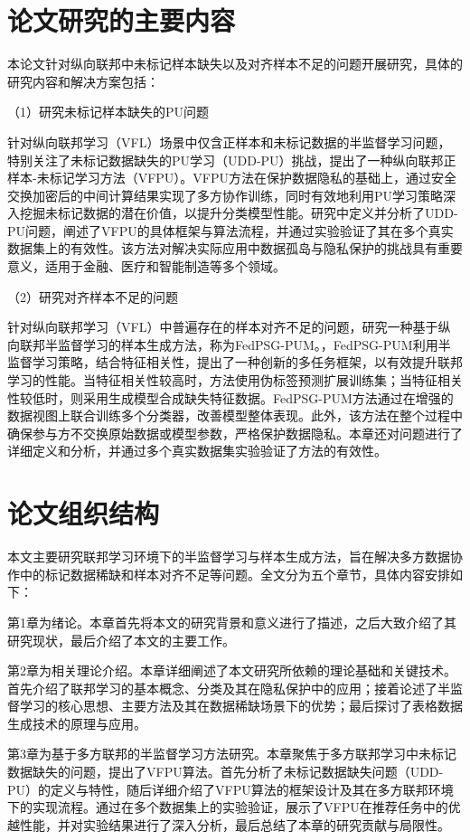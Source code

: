 \section{论文研究的主要内容}
本论文针对纵向联邦中未标记样本缺失以及对齐样本不足的问题开展研究，具体的研究内容和解决方案包括：

（1）研究未标记样本缺失的PU问题

针对纵向联邦学习（VFL）场景中仅含正样本和未标记数据的半监督学习问题，特别关注了未标记数据缺失的PU学习（UDD-PU）挑战，提出了一种纵向联邦正样本-未标记学习方法（VFPU）。VFPU方法在保护数据隐私的基础上，通过安全交换加密后的中间计算结果实现了多方协作训练，同时有效地利用PU学习策略深入挖掘未标记数据的潜在价值，以提升分类模型性能。研究中定义并分析了UDD-PU问题，阐述了VFPU的具体框架与算法流程，并通过实验验证了其在多个真实数据集上的有效性。该方法对解决实际应用中数据孤岛与隐私保护的挑战具有重要意义，适用于金融、医疗和智能制造等多个领域。

（2）研究对齐样本不足的问题

针对纵向联邦学习（VFL）中普遍存在的样本对齐不足的问题，研究一种基于纵向联邦半监督学习的样本生成方法，称为FedPSG-PUM。，FedPSG-PUM利用半监督学习策略，结合特征相关性，提出了一种创新的多任务框架，以有效提升联邦学习的性能。当特征相关性较高时，方法使用伪标签预测扩展训练集；当特征相关性较低时，则采用生成模型合成缺失特征数据。FedPSG-PUM方法通过在增强的数据视图上联合训练多个分类器，改善模型整体表现。此外，该方法在整个过程中确保参与方不交换原始数据或模型参数，严格保护数据隐私。本章还对问题进行了详细定义和分析，并通过多个真实数据集实验验证了方法的有效性。

\section{论文组织结构}
本文主要研究联邦学习环境下的半监督学习与样本生成方法，旨在解决多方数据协作中的标记数据稀缺和样本对齐不足等问题。全文分为五个章节，具体内容安排如下：


第1章为绪论。本章首先将本文的研究背景和意义进行了描述，之后大致介绍了其研究现状，最后介绍了本文的主要工作。

第2章为相关理论介绍。本章详细阐述了本文研究所依赖的理论基础和关键技术。首先介绍了联邦学习的基本概念、分类及其在隐私保护中的应用；接着论述了半监督学习的核心思想、主要方法及其在数据稀缺场景下的优势；最后探讨了表格数据生成技术的原理与应用。

第3章为基于多方联邦的半监督学习方法研究。本章聚焦于多方联邦学习中未标记数据缺失的问题，提出了VFPU算法。首先分析了未标记数据缺失问题（UDD-PU）的定义与特性，随后详细介绍了VFPU算法的框架设计及其在多方联邦环境下的实现流程。通过在多个数据集上的实验验证，展示了VFPU在推荐任务中的优越性能，并对实验结果进行了深入分析，最后总结了本章的研究贡献与局限性。

